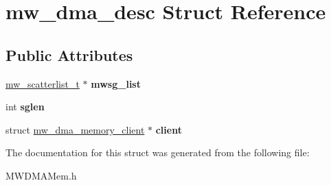 \hypertarget{structmw__dma__desc}{\section{mw\-\_\-dma\-\_\-desc Struct Reference}
\label{structmw__dma__desc}
}
\subsection*{Public Attributes}
\begin{DoxyCompactItemize}
\item 
\hypertarget{structmw__dma__desc_af6bf332aa6598bdf66186913f70919c5}{\hyperlink{struct__mw__scatterlist__t}{mw\-\_\-scatterlist\-\_\-t} $\ast$ {\bfseries mwsg\-\_\-list}}\label{structmw__dma__desc_af6bf332aa6598bdf66186913f70919c5}

\item 
\hypertarget{structmw__dma__desc_a39ab701adc7be6df818f9077fcd74cf1}{int {\bfseries sglen}}\label{structmw__dma__desc_a39ab701adc7be6df818f9077fcd74cf1}

\item 
\hypertarget{structmw__dma__desc_ad5382024e2f3b470debdaab251c6817f}{struct \hyperlink{structmw__dma__memory__client}{mw\-\_\-dma\-\_\-memory\-\_\-client} $\ast$ {\bfseries client}}\label{structmw__dma__desc_ad5382024e2f3b470debdaab251c6817f}

\end{DoxyCompactItemize}


The documentation for this struct was generated from the following file\-:\begin{DoxyCompactItemize}
\item 
M\-W\-D\-M\-A\-Mem.\-h\end{DoxyCompactItemize}
